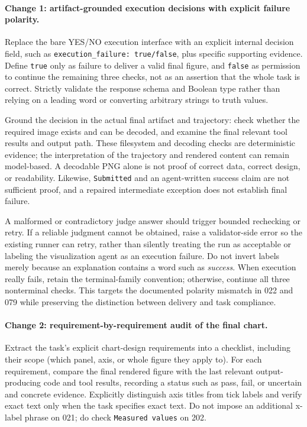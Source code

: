 \documentclass[11pt]{article}
\begin{document}
\paragraph{Change 1: artifact-grounded execution decisions with explicit
failure polarity.}
Replace the bare YES/NO execution interface with an explicit internal
decision field, such as \texttt{execution\_failure: true/false}, plus
specific supporting evidence. Define \texttt{true} only as failure to
deliver a valid final figure, and \texttt{false} as permission to continue
the remaining three checks, not as an assertion that the whole task is
correct. Strictly validate the response schema and Boolean type rather
than relying on a leading word or converting arbitrary strings to truth
values.

Ground the decision in the actual final artifact and trajectory:
check whether the required image exists and can be decoded, and examine
the final relevant tool results and output path. These filesystem and
decoding checks are deterministic evidence; the interpretation of the
trajectory and rendered content can remain model-based. A decodable PNG
alone is not proof of correct data, correct design, or readability.
Likewise, \texttt{Submitted} and an agent-written success claim are not
sufficient proof, and a repaired intermediate exception does not establish
final failure.

A malformed or contradictory judge answer should trigger bounded
rechecking or retry. If a reliable judgment cannot be obtained, raise a
validator-side error so the existing runner can retry, rather than
silently treating the run as acceptable or labeling the visualization
agent as an execution failure. Do not invert labels merely because an
explanation contains a word such as \emph{success}.
When execution really fails, retain the terminal-family convention;
otherwise, continue all three nonterminal checks.
This targets the documented polarity mismatch in 022 and 079 while
preserving the distinction between delivery and task compliance.

\paragraph{Change 2: requirement-by-requirement audit of the final chart.}
Extract the task's explicit chart-design requirements into a checklist,
including their scope (which panel, axis, or whole figure they apply to).
For each requirement, compare the final rendered figure with the last
relevant output-producing code and tool results, recording a status such
as pass, fail, or uncertain and concrete evidence.
Explicitly distinguish axis titles from tick labels and verify exact
text only when the task specifies exact text. Do not impose an additional
x-label phrase on 021; do check \texttt{Measured values} on 202.
\end{document}
